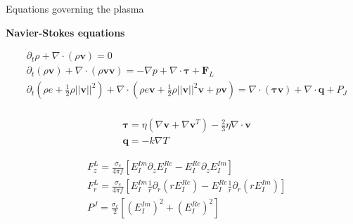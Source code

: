 \documentclass[24pt,t,table, aspectratio=169]{beamer}
\newcommand{\vecF}{\mathbf{F}}
\newcommand{\vecq}{\mathbf{q}}
\newcommand{\vectau}{\boldsymbol{\tau}}
\newcommand{\vecv}{\mathbf{v}}
\begin{document}
\begin{frame}{Equations governing the plasma}

\textbf{Navier-Stokes equations}

\begin{framed}
\begin{equation*}
\begin{aligned}
& \partial_t \rho + \nabla \cdot \left(\rho \vecv\right) = 0\\
& \partial_t \left(\rho \vecv\right) + \nabla \cdot \left(\rho \vecv \vecv \right) = -\nabla p + \nabla \cdot \vectau + \vecF_L\\
& \partial_t \left(\rho e + \frac{1}{2} \rho ||\vecv||^2\right) + \nabla \cdot \left(\rho e \vecv + \frac{1}{2} \rho ||\vecv||^2 \vecv + p \vecv\right) = \nabla \cdot \left(\vectau\vecv\right) + \nabla \cdot \vecq + P_J\\
\end{aligned}
\end{equation*}
\end{framed}

{
\vspace{-.7cm}
\begin{minipage}{0.49\linewidth}
\begin{equation*}
\begin{aligned}
& \vectau = \eta \left(\nabla \vecv + \nabla \vecv^T\right) - \frac{2}{3} \eta \nabla \cdot \vecv\\
& \vecq = -k \nabla T
\end{aligned}
\end{equation*}
\end{minipage}
\begin{minipage}{0.49\linewidth}
\begin{equation*}
\begin{aligned}
& F_z^L = \frac{\sigma_e}{4 \pi f} \left[E_I^{Im} \partial_z E_I^{Re} - E_I^{Re} \partial_z E_I^{Im}\right]\\
& F_r^L = \frac{\sigma_e}{4 \pi f} \left[E_I^{Im} \frac{1}{r}\partial_r (r E_I^{Re}) - E_I^{Re} \frac{1}{r} \partial_r (r E_I^{Im})\right]\\
& P^J = \frac{\sigma_e}{2} \left[(E_I^{Im})^2 + (E_I^{Re})^2\right]
\end{aligned}
\end{equation*}
\end{minipage}
}

\end{frame}
\end{document}
